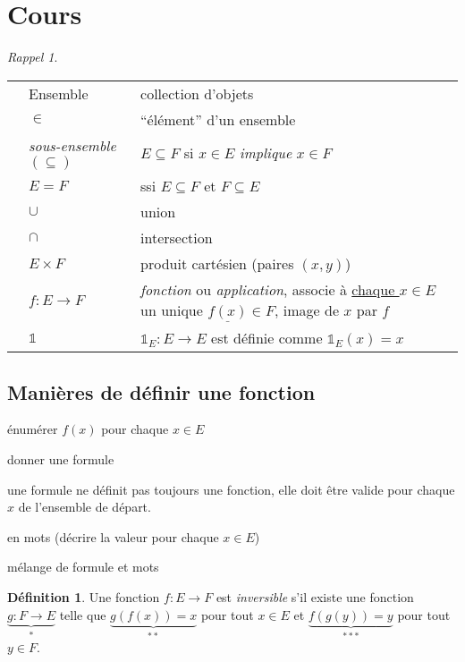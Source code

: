 \documentclass{report}
\newcounter{cours}
\newcommand*{\cours}{\section*{Cours \thecours}\stepcounter{cours}}
\theoremstyle{definition}
\newtheorem*{defin}{D\'efinition}
\theoremstyle{remark}
\newtheorem*{rappel}{Rappel}
\begin{document}
	\cours
	\begin{rappel}
		~

		\begin{tabularx}{.9\textwidth}{cl>{\raggedright\arraybackslash}X}
			\textbullet&Ensemble&collection d'objets\\
			\textbullet&$\in$&``\'el\'ement'' d'un ensemble\\
			\textbullet&\emph{sous-ensemble} $(\subseteq)$&$E \subseteq F$ si $x \in E$ \emph{implique} $x \in F$\\
			\textbullet&$E=F$&ssi $E \subseteq F$ et $F \subseteq E$\\
			\textbullet&$\cup$&union\\
			&$\cap$&intersection\\
			\textbullet&$E \times F$&produit cart\'esien (paires $(x,y)$)\\
			\textbullet&$f:E \to F$&\emph{fonction} ou \emph{application}, associe \`a \underline{chaque $x \in E$} un unique $\underline{f(x)} \in F$, image de $x$ par $f$\\
			\textbullet&$\mathds{1}$&$\mathds{1}_E:E \to E$ est d\'efinie comme $\mathds{1}_E(x)=x$
		\end{tabularx}
	\end{rappel}


	\subsection{Mani\`eres de d\'efinir une fonction}
	\begin{ulist}[noitemsep]
		\item \'enum\'erer $f(x)$ pour chaque $x \in E$
		\item donner une formule

		une formule ne d\'efinit pas toujours une fonction, elle doit \^etre valide pour chaque $x$ de l'ensemble de d\'epart.
		\item en mots (d\'ecrire la valeur pour chaque $x \in E$)
		\item m\'elange de formule et mots
	\end{ulist}

	\begin{defin}
		Une fonction $f:E \to F$ est \emph{inversible} s'il existe une fonction $\underbrace{g:F \to E}_{*}$ telle que $\underbrace{g(f(x))=x}_{**}$ pour tout $x \in E$ et $\underbrace{f(g(y))=y}_{***}$ pour tout $y \in F$.
	\end{defin}
\end{document}
